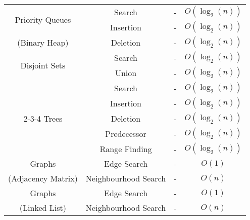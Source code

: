 \begin{center}
\begin{tabular}{| c | c | c | c |}
        \hline \hline
        \multirow{2}{*}{Priority Queues} 
                      & Search    & - & $O(\log_2(n))$ \\
                      & Insertion & - & $O(\log_2(n))$ \\
        (Binary Heap) & Deletion  & - & $O(\log_2(n))$ \\
        \hline \hline
        \multirow{2}{*}{Disjoint Sets} 
        & Search & - & $O(\log_2(n))$ \\
        & Union  & - & $O(\log_2(n))$ \\
        \hline \hline
        \multirow{5}{*}{2-3-4 Trees} 
        & Search        & - & $O(\log_2(n))$ \\
        & Insertion     & - & $O(\log_2(n))$ \\
        & Deletion      & - & $O(\log_2(n))$ \\
        & Predecessor   & - & $O(\log_2(n))$ \\
        & Range Finding & - & $O(\log_2(n))$ \\
        \hline \hline 
        Graphs             & Edge Search          & - & $O(1)$ \\
        (Adjacency Matrix) & Neighbourhood Search & - & $O(n)$ \\
        \hline \hline 
        Graphs        & Edge Search          & - & $O(1)$ \\
        (Linked List) & Neighbourhood Search & - & $O(n)$ \\
        \hline
    \end{tabular}
\end{center}

